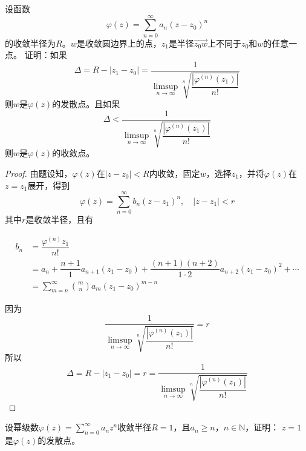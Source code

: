 \begin{lemma}\label{lemma:radius}

    设函数
    $$\varphi(z) = \sum\limits_{n = 0}^{\infty}{a_n (z - z_0)^n}$$
    的收敛半径为$R$。$w$是收敛圆边界上的点，$z_1$是半径$\vec{z_0w}$上不同于$z_0$和$w$的任意一点。
    证明：如果
    $$\Delta = R - |z_1 - z_0| = \dfrac{1}{\limsup\limits_{n \to \infty}{\sqrt[n]{\dfrac{|\varphi^{(n)}(z_1)|}{n!}}}}$$
    则$w$是$\varphi(z)$的发散点。且如果
    $$\Delta < \dfrac{1}{\limsup\limits_{n \to \infty}{\sqrt[n]{\dfrac{|\varphi^{(n)}(z_1)|}{n!}}}}$$
    则$w$是$\varphi(z)$的收敛点。

\end{lemma}

\begin{proof}

    由题设知，$\varphi(z)$在$|z - z_0| < R$内收敛，固定$w$，选择$z_1$，并将$\varphi(z)$在$z = z_1$展开，得到
    $$\varphi(z) = \sum\limits_{n = 0}^{\infty}{b_n (z - z_1)^n}, \quad |z - z_1| < r$$
    其中$r$是收敛半径，且有

    \begin{align*}
        b_n & = \dfrac{\varphi^{(n)}{z_1}}{n!} \\
        & = a_n + \dfrac{n + 1}{1}a_{n + 1}(z_1 - z_0) + \dfrac{(n + 1)(n + 2)}{1 \cdot 2}a_{n + 2}(z_1 - z_0)^2 + \cdots \\
        & = \sum\limits_{m = n}^{\infty}{\binom{m}{n}a_m(z_1 - z_0)^{m - n}}
    \end{align*}

    因为
    $$\dfrac{1}{\limsup\limits_{n \to \infty}{\sqrt[n]{\dfrac{|\varphi^{(n)}(z_1)|}{n!}}}} = r$$
    所以
    $$\Delta = R - |z_1 - z_0| = r = \dfrac{1}{\limsup\limits_{n \to \infty}{\sqrt[n]{\dfrac{|\varphi^{(n)}(z_1)|}{n!}}}}$$

\end{proof}

\begin{theorem}
    
    设幂级数$\varphi(z) = \sum\limits_{n = 0}^{\infty}{a_n z^n}$收敛半径$R = 1$，且$a_n \geq n$，$n \in \mathbb{N}$，证明：
    $z = 1$是$\varphi(z)$的发散点。

\end{theorem}

